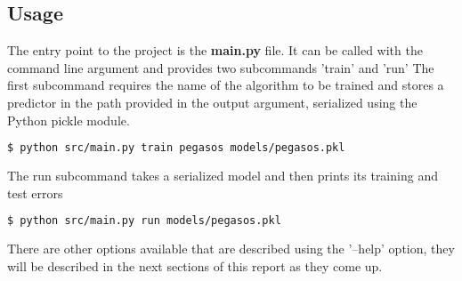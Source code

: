 \subsection{Usage}
The entry point to the project is the {\bf main.py} file. It can be called with the command line argument and provides two subcommands 'train' and 'run'
The first subcommand requires the name of the algorithm to be trained and stores a predictor in the path provided in the output argument, serialized using the Python pickle module.

\begin{lstlisting}[language=bash]
  $ python src/main.py train pegasos models/pegasos.pkl
\end{lstlisting}


The run subcommand takes a serialized model and then prints its training and test errors

\begin{lstlisting}[language=bash]
  $ python src/main.py run models/pegasos.pkl
\end{lstlisting}


There are other options available that are described using the '--help' option, they will be described in the next sections of this report as they come up.